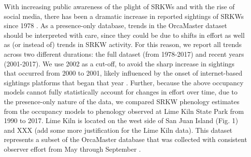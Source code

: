 \documentclass{article}
\begin{document}
\par With increasing public awareness of the plight of SRKWs and with the rise of social media, there has been a dramatic increase in reported sightings of SRKWs since 1978 \citep{olson2018}. As a presence-only database, trends in the OrcaMaster dataset should be interpreted with care, since they could be due to shifts in effort as well as (or instead of) trends in SRKW activity. For this reason, we report all trends across two different durations: the full dataset (from 1978-2017) and recent years (2001-2017). We use 2002 as a cut-off, to avoid the sharp increase in sightings that occurred from 2000 to 2001, likely influenced by the onset of internet-based sightings platforms that began that year \citep{olson2018}. Further, because the above occupancy models cannot fully statistically account for changes in effort over time, due to the presence-only nature of the data, we compared SRKW phenology estimates from the occupancy models to phenology observed at Lime Kiln State Park from 1990 to 2017. Lime Kiln is located on the west side of San Juan Island (Fig. 1) and XXX (add some more justification for the Lime Kiln data). This dataset represents a subset of the OrcaMaster database that was collected with consistent observer effort from May through September \citep{olson2018}.  
\end{document}
